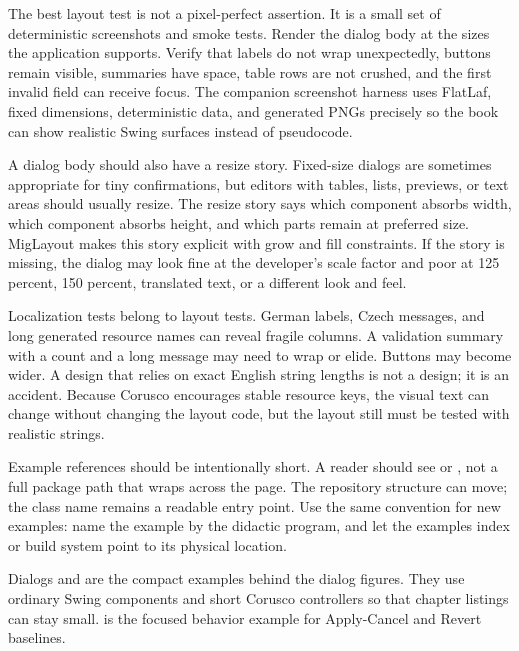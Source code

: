 The best layout test is not a pixel-perfect assertion. It is a small set of
deterministic screenshots and smoke tests. Render the dialog body at the sizes
the application supports. Verify that labels do not wrap unexpectedly, buttons
remain visible, summaries have space, table rows are not crushed, and the first
invalid field can receive focus. The companion screenshot harness uses FlatLaf,
fixed dimensions, deterministic data, and generated PNGs precisely so the book
can show realistic Swing surfaces instead of pseudocode.

A dialog body should also have a resize story. Fixed-size dialogs are sometimes
appropriate for tiny confirmations, but editors with tables, lists, previews,
or text areas should usually resize. The resize story says which component
absorbs width, which component absorbs height, and which parts remain at
preferred size. MigLayout makes this story explicit with grow and fill
constraints. If the story is missing, the dialog may look fine at the
developer's scale factor and poor at 125 percent, 150 percent, translated text,
or a different look and feel.

Localization tests belong to layout tests. German labels, Czech messages, and
long generated resource names can reveal fragile columns. A validation summary
with a count and a long message may need to wrap or elide. Buttons may become
wider. A design that relies on exact English string lengths is not a design;
it is an accident. Because Corusco encourages stable resource keys, the visual
text can change without changing the layout code, but the layout still must be
tested with realistic strings.

Example references should be intentionally short. A reader should see
\dialogExample{} or \dialogValidationExample{}, not a full package path that
wraps across the page. The repository structure can move; the class name
remains a readable entry point. Use the same convention for new examples: name
the example by the didactic program, and let the examples index or build system
point to its physical location.

\begin{examplebox}{Dialogs}
\dialogValidationExample{} and \dialogActiveEditorExample{} are the compact
examples behind the dialog figures. They use ordinary Swing components and
short Corusco controllers so that chapter listings can stay small.
\dialogApplyRevertExample{} is the focused behavior example for Apply-Cancel
and Revert baselines.
\end{examplebox}

